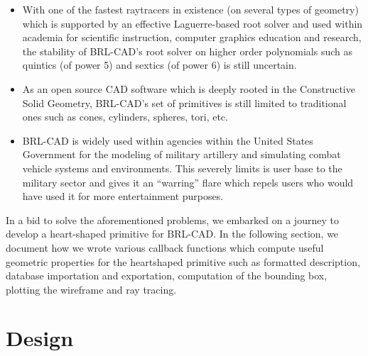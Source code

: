 \begin{itemize}
\item With   one   of   the   fastest   ray­tracers   in   existence   (on   several   types   of  
geometry)   which   is   supported   by   an   effective   Laguerre-­based   root   solver  
and   used   within   academia   for   scientific   instruction,   computer   graphics  
education   and   research,   the   stability   of   BRL­-CAD's   root   solver   on  
higher ­order   polynomials   such   as   quintics   (of   power   5)   and   sextics   (of  
power 6) is still uncertain.

\item As   an   open   source   CAD   software   which   is   deeply   rooted   in   the  
Constructive   Solid   Geometry,   BRL-­CAD's   set   of   primitives   is   still   limited  
to traditional ones such as cones, cylinders, spheres, tori, etc.

\item BRL­-CAD   is   widely   used   within   agencies   within   the   United   States  
Government   for   the   modeling   of   military   artillery   and   simulating   combat  vehicle   systems   and   environments.   This   severely   limits   is   user   base   to  the   military   sector   and   gives   it   an   “­warring”   flare   which   repels   users   who  would have used it for more entertainment purposes.
\end{itemize}

In   a   bid   to   solve   the   aforementioned   problems,   we   embarked   on   a   journey   to  
develop   a   heart-­shaped   primitive   for   BRL­-CAD.   In   the   following   section,   we  
document   how   we   wrote   various   callback   functions   which   compute   useful  
geometric   properties   for   the   heart­shaped   primitive   such   as   formatted  
description,   database   importation   and   exportation,   computation   of   the   bounding  
box, plotting the wireframe and ray tracing.


\section{Design}


